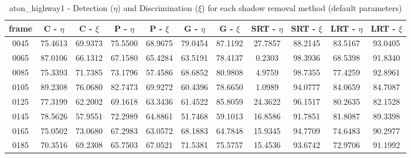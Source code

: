 \begin{appendices}
\begin{table}
\end{table}

\begin{table}
\centering
\caption{aton\_highway1 - Detection ($\eta$) and Discrimination ($\xi$) for each shadow removal method (default parameters)}
\begin{tabular}{ |c|c|c|c|c|c|c|c|c|c|c| }
	\hline
\textbf{frame} &  \textbf{C - $\eta$} &  \textbf{C - $\xi$} &  \textbf{P - $\eta$} &  \textbf{P - $\xi$} &  \textbf{G - $\eta$} &  \textbf{G - $\xi$} &  \textbf{SRT - $\eta$} &  \textbf{SRT - $\xi$} &  \textbf{LRT - $\eta$} &  \textbf{LRT - $\xi$} \\
\hline
\hline
0045 &  75.4613 &  69.9373 &   75.5500 &  68.9675 &   79.0454 &  87.1192 &   27.7857 &  88.2145 &   83.5167 &  93.0405    \\
\hline
0065 &  87.0106 &  66.1312 &   67.1580 &  65.4284 &   63.5191 &  78.4137 &   0.2303 &  98.3936 &   68.5398 &  91.8340    \\
\hline
0085 &  75.3393 &  71.7385 &   73.1796 &  57.4586 &   68.6852 &  80.9808 &   4.9759 &  98.7355 &   77.4259 &  92.8961    \\
\hline
0105 &  89.2308 &  76.0680 &   82.7473 &  69.9272 &   60.4396 &  78.6650 &   1.0989 &  94.0777 &   84.0659 &  84.7087    \\
\hline
0125 &  77.3199 &  62.2002 &   69.1618 &  63.3436 &   61.4522 &  85.8059 &   24.3622 &  96.1517 &   80.2635 &  82.1528    \\
\hline
0145 &  78.5626 &  57.9551 &   72.2989 &  64.8861 &   51.7468 &  59.1013 &   16.8586 &  91.7851 &   81.8087 &  89.3398    \\
\hline
0165 &  75.0502 &  73.0680 &   67.2983 &  63.0572 &   68.1883 &  64.7848 &   15.9345 &  94.7709 &   74.6483 &  90.2977    \\
\hline
0185 &  70.3516 &  69.2308 &   65.7503 &  67.0521 &   71.5381 &  75.5757 &   15.4536 &  93.6742 &   72.9706 &  91.1992    \\
\hline
\end{tabular}

\end{table}


\end{appendices}
